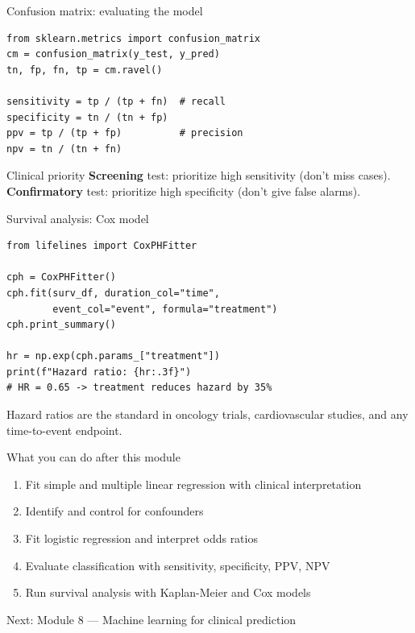 \documentclass[aspectratio=169,11pt]{beamer}
\begin{document}
\begin{frame}[fragile]{Confusion matrix: evaluating the model}
\begin{verbatim}
from sklearn.metrics import confusion_matrix
cm = confusion_matrix(y_test, y_pred)
tn, fp, fn, tp = cm.ravel()

sensitivity = tp / (tp + fn)  # recall
specificity = tn / (tn + fp)
ppv = tp / (tp + fp)          # precision
npv = tn / (tn + fn)
\end{verbatim}

\begin{alertblock}{Clinical priority}
\textbf{Screening} test: prioritize \alert{high sensitivity} (don't miss cases).\\
\textbf{Confirmatory} test: prioritize \alert{high specificity} (don't give false alarms).
\end{alertblock}
\end{frame}

\begin{frame}[fragile]{Survival analysis: Cox model}
\begin{verbatim}
from lifelines import CoxPHFitter

cph = CoxPHFitter()
cph.fit(surv_df, duration_col="time",
        event_col="event", formula="treatment")
cph.print_summary()

hr = np.exp(cph.params_["treatment"])
print(f"Hazard ratio: {hr:.3f}")
# HR = 0.65 -> treatment reduces hazard by 35%
\end{verbatim}

\vspace{4pt}
Hazard ratios are the standard in oncology trials, cardiovascular studies, and any time-to-event endpoint.
\end{frame}

\begin{frame}{What you can do after this module}
\begin{enumerate}
  \item Fit simple and multiple linear regression with clinical interpretation
  \item Identify and control for confounders
  \item Fit logistic regression and interpret odds ratios
  \item Evaluate classification with sensitivity, specificity, PPV, NPV
  \item Run survival analysis with Kaplan-Meier and Cox models
\end{enumerate}

\vspace{12pt}
\centering
\Large \alert{Next: Module 8 --- Machine learning for clinical prediction}
\end{frame}
\end{document}
